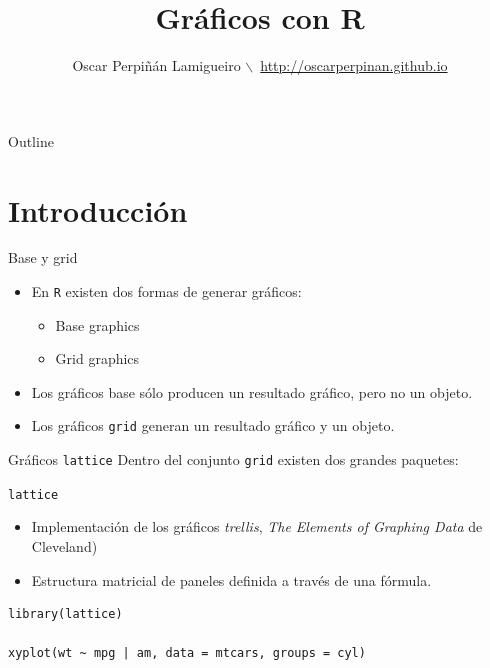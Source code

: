 \documentclass[xcolor={usenames,svgnames,dvipsnames}]{beamer}
\author{Oscar Perpiñán Lamigueiro $\backslash$\ \url{http://oscarperpinan.github.io}}
\date{}
\title{Gráficos con R}
\begin{document}
\maketitle
\begin{frame}{Outline}
\tableofcontents
\end{frame}



\section{Introducción}
\label{sec:orgheadline4}
\begin{frame}[fragile,label={sec:orgheadline1}]{Base y grid}
 \begin{itemize}
\item En \texttt{R} existen dos formas de generar gráficos:
\begin{itemize}
\item Base graphics
\item Grid graphics
\end{itemize}
\item Los gráficos base sólo producen un resultado gráfico, pero no un objeto.
\item Los gráficos \texttt{grid} generan un resultado gráfico \alert{y} un objeto.
\end{itemize}
\end{frame}

\begin{frame}[fragile,label={sec:orgheadline2}]{Gráficos \texttt{lattice}}
 Dentro del conjunto \texttt{grid} existen dos grandes paquetes:

\begin{block}{\texttt{lattice}}
\begin{itemize}
\item Implementación de los gráficos \emph{trellis}, \emph{The Elements of Graphing Data} de Cleveland)

\item Estructura matricial de paneles definida a través de una fórmula.
\end{itemize}

\lstset{language=R,label= ,caption= ,captionpos=b,numbers=none}
\begin{lstlisting}
library(lattice)

xyplot(wt ~ mpg | am, data = mtcars, groups = cyl)
\end{lstlisting}
\end{block}
\end{frame}
\end{document}

